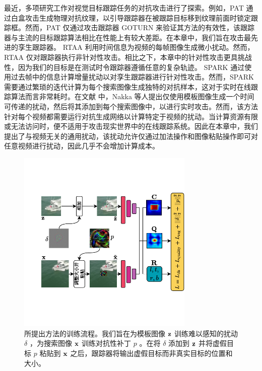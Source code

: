 最近，多项研究工作对视觉目标跟踪任务的对抗攻击进行了探索。例如，PAT \cite{PAT} 通过白盒攻击生成物理对抗纹理，以引导跟踪器在被跟踪目标移到纹理前面时锁定跟踪框。然而，PAT 仅通过攻击跟踪器 GOTURN \cite{GOTURN} 来验证其方法的有效性，该跟踪器与主流的目标跟踪算法相比在性能上有较大差距。在本章中，我们旨在攻击最先进的孪生跟踪器。
RTAA \cite{RTAA} 利用时间信息为视频的每帧图像生成微小扰动。然而，RTAA 仅对跟踪器执行非针对性攻击。相比之下，本章中的针对性攻击更具挑战性，因为我们的目标是在测试时令跟踪器遵循任意的复杂轨迹。
SPARK \cite{SPARK} 通过使用过去帧中的信息计算增量扰动以对孪生跟踪器进行针对性攻击。然而，SPARK 需要通过繁琐的迭代计算为每个搜索图像生成独特的对抗样本，这对于实时在线跟踪算法而言非常耗时。在文献 \cite{TTP} 中，Nakka 等人提出仅使用模板图像生成一个时间可传递的扰动，然后将其添加到每个搜索图像中，以进行实时攻击。然而，该方法针对每个视频都需要运行对抗生成网络以计算特定于视频的扰动。当计算资源有限或无法访问时，便不适用于攻击现实世界中的在线跟踪系统。因此在本章中，我们提出了与视频无关的通用扰动，该扰动允许仅通过加法操作和图像粘贴操作即可对任意视频进行扰动，因此几乎不会增加计算成本。

\begin{figure}[t]
\centering
\includegraphics[width=0.75\textwidth]{Img/attack/network_v5.pdf}
\caption{所提出方法的训练流程。我们旨在为模板图像 $\textbf z$ 训练难以感知的扰动 $\delta$ ，为搜索图像 $\textbf x$ 训练对抗性补丁 $p$ 。在将 $\delta$ 添加到 $\textbf z$ 并将虚假目标 $p$ 粘贴到 $\textbf x$ 之后，跟踪器将输出虚假目标而非真实目标的位置和大小。}
\label{fig:net}
\end{figure}

